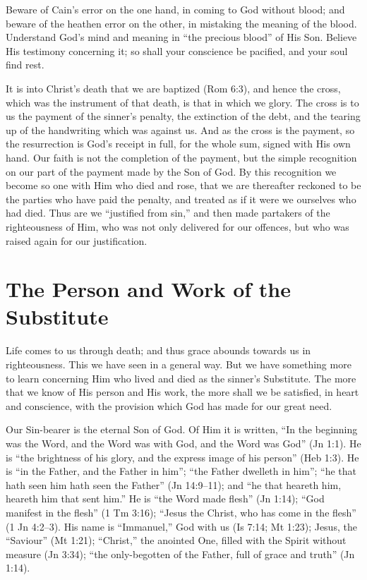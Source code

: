 \documentclass[
]{book}
\begin{document}
Beware of Cain's error on the one hand, in coming to God without blood; and beware of the heathen error on the other, in mistaking the meaning of the blood. Understand God's mind and meaning in ``the precious blood'' of His Son. Believe His testimony concerning it; so shall your conscience be pacified, and your soul find rest.

It is into Christ's death that we are baptized (Rom 6:3), and hence the cross, which was the instrument of that death, is that in which we glory. The cross is to us the payment of the sinner's penalty, the extinction of the debt, and the tearing up of the handwriting which was against us. And as the cross is the payment, so the resurrection is God's receipt in full, for the whole sum, signed with His own hand. Our faith is not the completion of the payment, but the simple recognition on our part of the payment made by the Son of God. By this recognition we become so one with Him who died and rose, that we are thereafter reckoned to be the parties who have paid the penalty, and treated as if it were we ourselves who had died. Thus are we ``justified from sin,'' and then made partakers of the righteousness of Him, who was not only delivered for our offences, but who was raised again for our justification.

\hypertarget{the-person-and-work-of-the-substitute}{%
\chapter{The Person and Work of the Substitute}\label{the-person-and-work-of-the-substitute}}

Life comes to us through death; and thus grace abounds towards us in righteousness. This we have seen in a general way. But we have something more to learn concerning Him who lived and died as the sinner's Substitute. The more that we know of His person and His work, the more shall we be satisfied, in heart and conscience, with the provision which God has made for our great need.

Our Sin-bearer is the eternal Son of God. Of Him it is written, ``In the beginning was the Word, and the Word was with God, and the Word was God'' (Jn 1:1). He is ``the brightness of his glory, and the express image of his person'' (Heb 1:3). He is ``in the Father, and the Father in him''; ``the Father dwelleth in him''; ``he that hath seen him hath seen the Father'' (Jn 14:9--11); and ``he that heareth him, heareth him that sent him.'' He is ``the Word made flesh'' (Jn 1:14); ``God manifest in the flesh'' (1 Tm 3:16); ``Jesus the Christ, who has come in the flesh'' (1 Jn 4:2--3). His name is ``Immanuel,'' God with us (Is 7:14; Mt 1:23); Jesus, the ``Saviour'' (Mt 1:21); ``Christ,'' the anointed One, filled with the Spirit without measure (Jn 3:34); ``the only-begotten of the Father, full of grace and truth'' (Jn 1:14).
\end{document}
